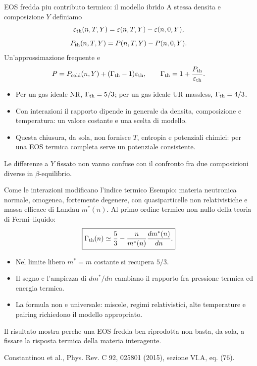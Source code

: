 \begin{frame}[t]{EOS fredda piu contributo termico: il modello ibrido}
\vspace*{3mm}
\small
A stessa densita e composizione $Y$ definiamo
\[
\varepsilon_{\rm th}(n,T,Y)=\varepsilon(n,T,Y)-\varepsilon(n,0,Y),
\]
\[
P_{\rm th}(n,T,Y)=P(n,T,Y)-P(n,0,Y).
\]
Un'approssimazione frequente e
\[
P=P_{\rm cold}(n,Y)+(\Gamma_{\rm th}-1)\varepsilon_{\rm th},
\qquad
\Gamma_{\rm th}=1+\frac{P_{\rm th}}{\varepsilon_{\rm th}}.
\]
\begin{itemize}
\item Per un gas ideale NR, $\Gamma_{\rm th}=5/3$; per un gas ideale
UR massless, $\Gamma_{\rm th}=4/3$.
\item Con interazioni il rapporto dipende in generale da densita,
composizione e temperatura: un valore costante e una scelta di modello.
\item Questa chiusura, da sola, non fornisce $T$, entropia e potenziali
chimici: per una EOS termica completa serve un potenziale consistente.
\end{itemize}
Le differenze a $Y$ fissato non vanno confuse con il confronto fra due
composizioni diverse in $\beta$-equilibrio.
\end{frame}

\begin{frame}[t]{Come le interazioni modificano l'indice termico}
\vspace*{3mm}
\small
Esempio: materia neutronica normale, omogenea, fortemente degenere,
con quasiparticelle non relativistiche e massa efficace di Landau $m^*(n)$.
Al primo ordine termico non nullo della teoria di Fermi--liquido:
\[
\boxed{\Gamma_{\rm th}(n)\simeq\frac53-
\frac{n}{m^*(n)}\frac{dm^*(n)}{dn}.}
\]
\begin{itemize}
\item Nel limite libero $m^*=m$ costante si recupera $5/3$.
\item Il segno e l'ampiezza di $dm^*/dn$ cambiano il rapporto fra
pressione termica ed energia termica.
\item La formula non e universale: miscele, regimi relativistici,
alte temperature e pairing richiedono il modello appropriato.
\end{itemize}
Il risultato mostra perche una EOS fredda ben riprodotta non basta,
da sola, a fissare la risposta termica della materia interagente.
\par\smallskip
{\footnotesize Constantinou et al., Phys. Rev. C 92, 025801 (2015),
sezione VI.A, eq. (76).}
\end{frame}

